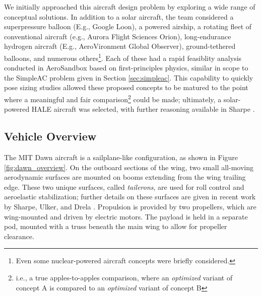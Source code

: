 We initially approached this aircraft design problem by exploring a wide range of conceptual solutions. In addition to a solar aircraft, the team considered a superpressure balloon (E.g., Google Loon), a powered airship, a rotating fleet of conventional aircraft (e.g., Aurora Flight Sciences Orion), long-endurance hydrogen aircraft (E.g., AeroVironment Global Observer), ground-tethered balloons, and numerous others\footnote{Even some nuclear-powered aircraft concepts were briefly considered.}. Each of these had a rapid feasiblity analysis conducted in AeroSandbox based on first-principles physics, similar in scope to the SimpleAC problem given in Section \ref{sec:simpleac}. This capability to quickly pose sizing studies allowed these proposed concepts to be matured to the point where a meaningful and fair comparison\footnote{i.e., a true apples-to-apples comparison, where an \emph{optimized} variant of concept A is compared to an \emph{optimized} variant of concept B} could be made; ultimately, a solar-powered HALE aircraft was selected, with further reasoning available in Sharpe \cite{sharpe_optimization_2021}.

\subsection{Vehicle Overview}

The MIT Dawn aircraft is a sailplane-like configuration, as shown in Figure \ref{fig:dawn_overview}. On the outboard sections of the wing, two small all-moving aerodynamic surfaces are mounted on booms extending from the wing trailing edge. These two unique surfaces, called \emph{tailerons}, are used for roll control and aeroelastic stabilization; further details on these surfaces are given in recent work by Sharpe, Ulker, and Drela \cite{sharpe_tailerons_2023}. Propulsion is provided by two propellers, which are wing-mounted and driven by electric motors. The payload is held in a separate pod, mounted with a truss beneath the main wing to allow for propeller clearance.


